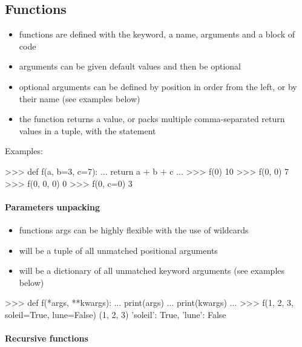 \documentclass[twocolumn]{article}
\let\oldparagraph\paragraph
\renewcommand{\paragraph}[1]{\oldparagraph{#1}\mbox{}}
\begin{document}
\subsection{Functions}\label{functions}

\begin{itemize}
\item functions are defined with the  keyword, a name, arguments and a block of code
\item arguments can be given default values and then be optional
\item optional arguments can be defined by position in order from the left, or by their name (see examples below)
\item the function returns a value, or packs multiple comma-separated return values in a tuple, with the  statement
\end{itemize}

\newpage

Examples:
\begin{python}
>>> def f(a, b=3, c=7):
...     return a + b + c
... 
>>> f(0)
10
>>> f(0, 0)
7
>>> f(0, 0, 0)
0
>>> f(0, c=0)
3
\end{python}

\paragraph{Parameters unpacking}\label{paramunpacking}

\begin{itemize}
\item functions args can be highly flexible with the use of wildcards
\item {} will be a tuple of all unmatched positional arguments
\item {} will be a dictionary of all unmatched keyword arguments (see examples below)
\end{itemize}

\begin{python}
>>> def f(*args, **kwargs):
...     print(args)
...     print(kwargs)
... 
>>> f(1, 2, 3, soleil=True, lune=False)
(1, 2, 3)
{'soleil': True, 'lune': False}
\end{python}

\paragraph{Recursive functions}\label{recursivity}
\end{document}
